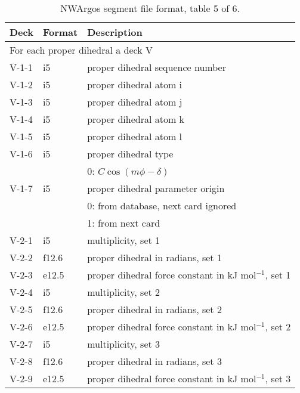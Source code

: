 \begin{table}[htbp]
\center

\label{tbl:nwaseg5}

\begin{tabular*}{150mm}{p{12mm}p{12mm}l}
\hline\hline
Deck & Format & Description \\ \hline
\multicolumn{3}{l}{For each proper dihedral a deck V} \\
V-1-1 & i5     & proper dihedral sequence number \\
V-1-2 & i5     & proper dihedral atom i \\
V-1-3 & i5     & proper dihedral atom j \\
V-1-4 & i5     & proper dihedral atom k \\
V-1-5 & i5     & proper dihedral atom l \\
V-1-6 & i5     & proper dihedral type \\
      &        & 0: $C\cos(m\phi-\delta)$\\
V-1-7 & i5     & proper dihedral parameter origin\\
      &        & 0: from database, next card ignored \\
      &        & 1: from next card\\
V-2-1 & i5     & multiplicity, set 1\\
V-2-2 & f12.6  & proper dihedral in radians, set 1\\
V-2-3 & e12.5  & proper dihedral force constant in kJ mol$^{-1}$, set 1 \\
V-2-4 & i5     & multiplicity, set 2\\
V-2-5 & f12.6  & proper dihedral in radians, set 2\\
V-2-6 & e12.5  & proper dihedral force constant in kJ mol$^{-1}$, set 2 \\
V-2-7 & i5     & multiplicity, set 3\\
V-2-8 & f12.6  & proper dihedral in radians, set 3\\
V-2-9 & e12.5  & proper dihedral force constant in kJ mol$^{-1}$, set 3 \\
\hline
\end{tabular*}

\caption{NWArgos segment file format, table 5 of 6.}
\end{table}


